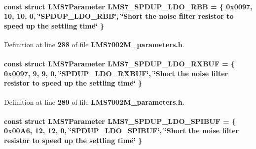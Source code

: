 \paragraph[{L\+M\+S7\+\_\+\+S\+P\+D\+U\+P\+\_\+\+L\+D\+O\+\_\+\+R\+BB}]{\setlength{\rightskip}{0pt plus 5cm}const struct {\bf L\+M\+S7\+Parameter} L\+M\+S7\+\_\+\+S\+P\+D\+U\+P\+\_\+\+L\+D\+O\+\_\+\+R\+BB = \{ 0x0097, 10, 10, 0, \char`\"{}\+S\+P\+D\+U\+P\+\_\+\+L\+D\+O\+\_\+\+R\+B\+B\char`\"{}, \char`\"{}\+Short the noise filter resistor to speed up the settling time\char`\"{} \}\hspace{0.3cm}{\ttfamily [static]}}\label{LMS7002M__parameters_8h_a4fac7e3025f886e9256cd6636e5b9b67}


Definition at line {\bf 288} of file {\bf L\+M\+S7002\+M\+\_\+parameters.\+h}.

\paragraph[{L\+M\+S7\+\_\+\+S\+P\+D\+U\+P\+\_\+\+L\+D\+O\+\_\+\+R\+X\+B\+UF}]{\setlength{\rightskip}{0pt plus 5cm}const struct {\bf L\+M\+S7\+Parameter} L\+M\+S7\+\_\+\+S\+P\+D\+U\+P\+\_\+\+L\+D\+O\+\_\+\+R\+X\+B\+UF = \{ 0x0097, 9, 9, 0, \char`\"{}\+S\+P\+D\+U\+P\+\_\+\+L\+D\+O\+\_\+\+R\+X\+B\+U\+F\char`\"{}, \char`\"{}\+Short the noise filter resistor to speed up the settling time\char`\"{} \}\hspace{0.3cm}{\ttfamily [static]}}\label{LMS7002M__parameters_8h_a1da8106970dc0104632a5e29d725cf7a}


Definition at line {\bf 289} of file {\bf L\+M\+S7002\+M\+\_\+parameters.\+h}.

\paragraph[{L\+M\+S7\+\_\+\+S\+P\+D\+U\+P\+\_\+\+L\+D\+O\+\_\+\+S\+P\+I\+B\+UF}]{\setlength{\rightskip}{0pt plus 5cm}const struct {\bf L\+M\+S7\+Parameter} L\+M\+S7\+\_\+\+S\+P\+D\+U\+P\+\_\+\+L\+D\+O\+\_\+\+S\+P\+I\+B\+UF = \{ 0x00\+A6, 12, 12, 0, \char`\"{}\+S\+P\+D\+U\+P\+\_\+\+L\+D\+O\+\_\+\+S\+P\+I\+B\+U\+F\char`\"{}, \char`\"{}\+Short the noise filter resistor to speed up the settling time\char`\"{} \}\hspace{0.3cm}{\ttfamily [static]}}\label{LMS7002M__parameters_8h_a448a8483e7b6d6c9a9b2619605ee320d}


